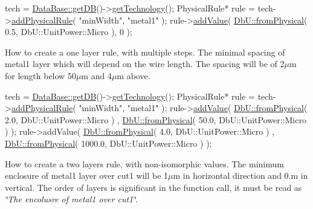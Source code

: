 \begin{DoxyCode}
tech = \mbox{\hyperlink{classHurricane_1_1DataBase_a53d0b9fcd06b73f3968c8f238f377a88}{DataBase::getDB}}()->\mbox{\hyperlink{classHurricane_1_1DataBase_a144480c54b0f9fbda57622ad6767ab8a}{getTechnology}}();
PhysicalRule* rule = tech->\mbox{\hyperlink{classHurricane_1_1Technology_a267e44b205b97ff46297d16ed278a5bc}{addPhysicalRule}}( \textcolor{stringliteral}{"minWidth"}, \textcolor{stringliteral}{"metal1"} );
rule->\mbox{\hyperlink{classHurricane_1_1PhysicalRule_ada08351fb24f36a63f4e3a3c524000a2}{addValue}}( \mbox{\hyperlink{group__DbUGroup_ga11d4dbd9134a19bda35cbacde1cb2769}{DbU::fromPhysical}}( 0.5, DbU::UnitPower::Micro ), 0 );
\end{DoxyCode}


How to create a one layer rule, with multiple steps. The minimal spacing of {\ttfamily metal1} layer which will depend on the wire length. The spacing will be of 2{$\mu$}m for length below 50{$\mu$}m and 4{$\mu$}m above.


\begin{DoxyCode}
tech = \mbox{\hyperlink{classHurricane_1_1DataBase_a53d0b9fcd06b73f3968c8f238f377a88}{DataBase::getDB}}()->\mbox{\hyperlink{classHurricane_1_1DataBase_a144480c54b0f9fbda57622ad6767ab8a}{getTechnology}}();
PhysicalRule* rule = tech->\mbox{\hyperlink{classHurricane_1_1Technology_a267e44b205b97ff46297d16ed278a5bc}{addPhysicalRule}}( \textcolor{stringliteral}{"minWidth"}, \textcolor{stringliteral}{"metal1"} );
rule->\mbox{\hyperlink{classHurricane_1_1PhysicalRule_ada08351fb24f36a63f4e3a3c524000a2}{addValue}}( \mbox{\hyperlink{group__DbUGroup_ga11d4dbd9134a19bda35cbacde1cb2769}{DbU::fromPhysical}}(    2.0, DbU::UnitPower::Micro )
              , \mbox{\hyperlink{group__DbUGroup_ga11d4dbd9134a19bda35cbacde1cb2769}{DbU::fromPhysical}}(   50.0, DbU::UnitPower::Micro ) );
rule->addValue( \mbox{\hyperlink{group__DbUGroup_ga11d4dbd9134a19bda35cbacde1cb2769}{DbU::fromPhysical}}(    4.0, DbU::UnitPower::Micro )
              , \mbox{\hyperlink{group__DbUGroup_ga11d4dbd9134a19bda35cbacde1cb2769}{DbU::fromPhysical}}( 1000.0, DbU::UnitPower::Micro ) );
\end{DoxyCode}


How to create a two layers rule, with non-\/isomorphic values. The minimum enclosure of {\ttfamily metal1} layer over {\ttfamily cut1} will be 1{$\mu$}m in horizontal direction and 0.m in vertical. The order of layers is significant in the function call, it must be read as {\itshape \char`\"{}\+The encolusre of metal1 over cut1\char`\"{}}.


